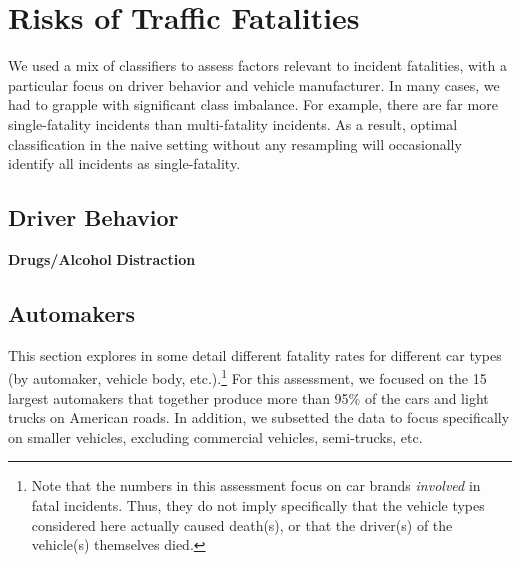 \documentclass[11pt, oneside,titlepage]{article}   	%
\begin{document}
\section*{Risks of Traffic Fatalities}
We used a mix of classifiers to assess factors relevant to incident fatalities, with a particular focus on driver behavior and vehicle manufacturer. In many cases, we had to grapple with significant class imbalance. For example, there are far more single-fatality incidents than multi-fatality incidents. As a result, optimal classification in the naive setting without any resampling will occasionally identify all incidents as single-fatality.   

\subsection*{Driver Behavior}
\textbf{Drugs/Alcohol}
\textbf{Distraction}

\subsection*{Automakers}

This section explores in some detail different fatality rates for different car types (by automaker, vehicle body, etc.).\footnote{Note that the numbers in this assessment focus on car brands \textit{involved} in fatal incidents. Thus, they do not imply specifically that the vehicle types considered here actually caused death(s), or that the driver(s) of the vehicle(s) themselves died.} For this assessment, we focused on the 15 largest automakers that together produce more than 95\% of the cars and light trucks on American roads. In addition, we subsetted the data to focus specifically on smaller vehicles, excluding commercial vehicles, semi-trucks, etc. \\
\end{document}
